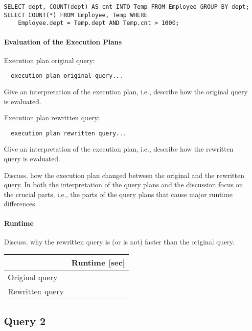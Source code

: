 \documentclass[11pt]{scrartcl}
\begin{document}
{\small
\begin{verbatim}
SELECT dept, COUNT(dept) AS cnt INTO Temp FROM Employee GROUP BY dept;
SELECT COUNT(*) FROM Employee, Temp WHERE
    Employee.dept = Temp.dept AND Temp.cnt > 1000;
\end{verbatim}
}

\paragraph{Evaluation of the Execution Plans}

Execution plan original query:

\begin{verbatim}
  execution plan original query...
\end{verbatim}

Give an interpretation of the execution plan, i.e., describe how the
original query is evaluated.

Execution plan rewritten query:

\begin{verbatim}
  execution plan rewritten query...
\end{verbatim}

Give an interpretation of the execution plan, i.e., describe how the
rewritten query is evaluated.

Discuss, how the execution plan changed between the original and the
rewritten query. In both the interpretation of the query plans and the
discussion focus on the crucial parts, i.e., the parts of the query
plans that cause major runtime differences.

\paragraph{Runtime} Discuss, why the rewritten query is (or is not)
faster than the original query.


\begin{table}[H]
  \begin{tabular}{l|r}
    & Runtime [sec] \\
   \hline
    Original query & \\
    Rewritten query & \\
  \end{tabular}
\end{table}

\subsection*{Query 2}
\end{document}
